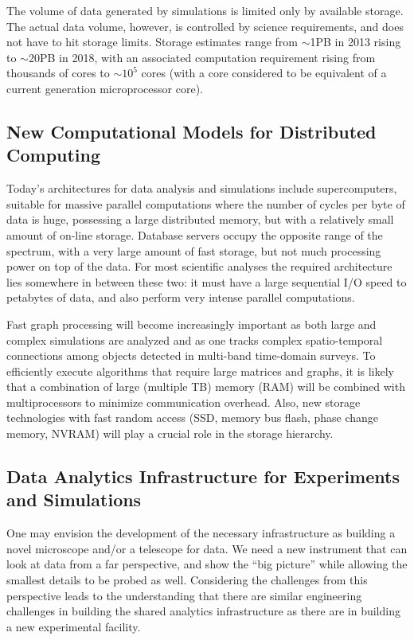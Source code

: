 The volume of data generated by simulations is limited only by
available storage. The actual data volume, however, is controlled by
science requirements, and does not have to hit storage limits. Storage
estimates range from $\sim$1PB in 2013 rising to $\sim$20PB in 2018,
with an associated computation requirement rising from thousands of
cores to $\sim 10^5$ cores (with a core considered to be equivalent of
a current generation microprocessor core).

\subsection{New Computational Models for Distributed
    Computing}

Today's architectures for data analysis and simulations include
supercomputers, suitable for massive parallel computations where the
number of cycles per byte of data is huge, possessing a large
distributed memory, but with a relatively small amount of on-line
storage. Database servers occupy the opposite range of the spectrum,
with a very large amount of fast storage, but not much processing
power on top of the data. For most scientific analyses the required
architecture lies somewhere in between these two: it must have a large
sequential I/O speed to petabytes of data, and also perform very
intense parallel computations. 

Fast graph processing will become increasingly important as both large
and complex simulations are analyzed and as one tracks complex
spatio-temporal connections among objects detected in multi-band
time-domain surveys. To efficiently execute algorithms that require
large matrices and graphs, it is likely that a combination of large
(multiple TB) memory (RAM) will be combined with multiprocessors to
minimize communication overhead. Also, new storage technologies with
fast random access (SSD, memory bus flash, phase change memory, NVRAM)
will play a crucial role in the storage hierarchy.

\subsection{Data Analytics Infrastructure for
    Experiments and Simulations}

\medskip

One may envision the development of the necessary infrastructure as
building a novel microscope and/or a telescope for data. We need a new
instrument that can look at data from a far perspective, and show the
``big picture'' while allowing the smallest details to be probed as
well. Considering the challenges from this perspective leads to the
understanding that there are similar engineering challenges in
building the shared analytics infrastructure as there are in building
a new experimental facility.

